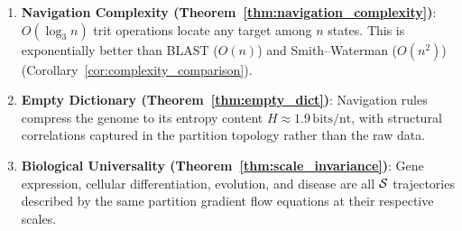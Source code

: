 \begin{chapterbox}[title=Chapter 4 --- Key Results Established]
\begin{enumerate}[label=\textbf{\arabic*.}]
  \item \textbf{Navigation Complexity (Theorem~\ref{thm:navigation_complexity})}:
        $O(\log_3 n)$ trit operations locate any target among $n$ states.
        This is exponentially better than BLAST ($O(n)$) and Smith--Waterman
        ($O(n^2)$) (Corollary~\ref{cor:complexity_comparison}).

  \item \textbf{Empty Dictionary (Theorem~\ref{thm:empty_dict})}:
        Navigation rules compress the genome to its entropy content
        $H \approx 1.9\,\mathrm{bits/nt}$, with structural correlations captured
        in the partition topology rather than the raw data.

  \item \textbf{Biological Universality (Theorem~\ref{thm:scale_invariance})}:
        Gene expression, cellular differentiation, evolution, and disease are
        all $\mathcal{S}$ trajectories described by the same partition gradient flow
        equations at their respective scales.
\end{enumerate}
\end{chapterbox}
